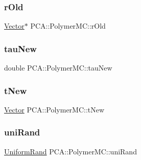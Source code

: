 \hypertarget{class_p_c_a_1_1_polymer_m_c_a6144923e16ec4e3086f92516d8a9117b}{}\label{class_p_c_a_1_1_polymer_m_c_a6144923e16ec4e3086f92516d8a9117b} 
\subsubsection{\texorpdfstring{r\+Old}{rOld}}
{\footnotesize\ttfamily \hyperlink{class_p_c_a_1_1_vector}{Vector}$\ast$ P\+C\+A\+::\+Polymer\+M\+C\+::r\+Old\hspace{0.3cm}{\ttfamily [private]}}

\hypertarget{class_p_c_a_1_1_polymer_m_c_a6400a8ec5f791281122167837d6e4d7d}{}\label{class_p_c_a_1_1_polymer_m_c_a6400a8ec5f791281122167837d6e4d7d} 
\subsubsection{\texorpdfstring{tau\+New}{tauNew}}
{\footnotesize\ttfamily double P\+C\+A\+::\+Polymer\+M\+C\+::tau\+New\hspace{0.3cm}{\ttfamily [private]}}

\hypertarget{class_p_c_a_1_1_polymer_m_c_a1220187032c23f9fd2d78886fd1815b3}{}\label{class_p_c_a_1_1_polymer_m_c_a1220187032c23f9fd2d78886fd1815b3} 
\subsubsection{\texorpdfstring{t\+New}{tNew}}
{\footnotesize\ttfamily \hyperlink{class_p_c_a_1_1_vector}{Vector} P\+C\+A\+::\+Polymer\+M\+C\+::t\+New\hspace{0.3cm}{\ttfamily [private]}}

\hypertarget{class_p_c_a_1_1_polymer_m_c_ac503a4c28f8c36289d34036ce1ebc0b2}{}\label{class_p_c_a_1_1_polymer_m_c_ac503a4c28f8c36289d34036ce1ebc0b2} 
\subsubsection{\texorpdfstring{uni\+Rand}{uniRand}}
{\footnotesize\ttfamily \hyperlink{class_p_c_a_1_1_uniform_rand}{Uniform\+Rand} P\+C\+A\+::\+Polymer\+M\+C\+::uni\+Rand\hspace{0.3cm}{\ttfamily [private]}}



